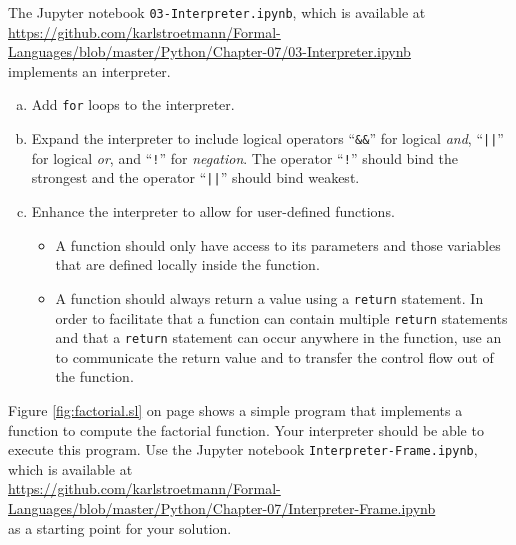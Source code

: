 \noindent
The Jupyter notebook \texttt{03-Interpreter.ipynb}, which is available at
\\[0.2cm]
\hspace*{0.3cm}
\href{https://github.com/karlstroetmann/Formal-Languages/blob/master/Python/Chapter-07/03-Interpreter.ipynb}{https://github.com/karlstroetmann/Formal-Languages/blob/master/Python/Chapter-07/03-Interpreter.ipynb}
\\[0.2cm]
implements an interpreter.

\exerciseEng
\begin{enumerate}[(a)]
\item Add \texttt{for} loops to the interpreter.
\item Expand the interpreter to include logical operators
      ``\texttt{\&\&}'' for logical \emph{and}, ``\texttt{||}'' for logical \emph{or},
      and ``\texttt{!}'' for \emph{negation}. The operator ``\texttt{!}'' should bind the
      strongest and the operator ``\texttt{||}'' should bind weakest.
\item Enhance the interpreter to allow for user-defined functions.
      \begin{itemize}
      \item A function should only have access to its parameters and those variables that
            are defined locally inside the function.  
      \item A function should always return a value using a \texttt{return} statement.
            In order to facilitate that a function can contain multiple \texttt{return}
            statements and that a \texttt{return} statement can occur
            anywhere in the function,  use an  to communicate the
            return value and to transfer the control flow out of the function.
      \end{itemize}
\end{enumerate}
Figure \ref{fig:factorial.sl} on page \pageref{fig:factorial.sl} shows a simple program
that implements a function to compute the factorial function.  Your interpreter should be able to execute this
program.
Use the Jupyter notebook \texttt{Interpreter-Frame.ipynb}, which is available at
\\[0.2cm]
\hspace*{0.3cm}
\href{https://github.com/karlstroetmann/Formal-Languages/blob/master/Python/Chapter-07/Interpreter-Frame.ipynb}{https://github.com/karlstroetmann/Formal-Languages/blob/master/Python/Chapter-07/Interpreter-Frame.ipynb}
\\[0.2cm]
as a starting point for your solution.
\eox

